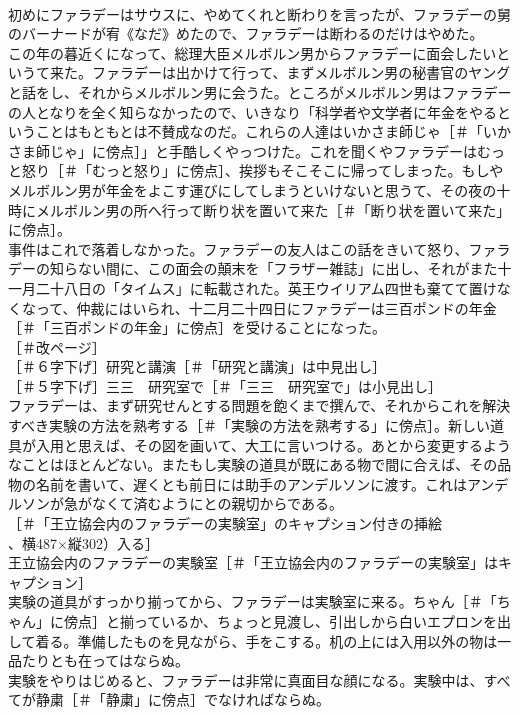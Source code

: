 \documentclass[8pt]{extreport}
\begin{document}
\begin{CJK}{UTF8}{min}
\\	初めにファラデーはサウスに、やめてくれと断わりを言ったが、ファラデーの舅のバーナードが宥《なだ》めたので、ファラデーは断わるのだけはやめた。
\\	この年の暮近くになって、総理大臣メルボルン男からファラデーに面会したいというて来た。ファラデーは出かけて行って、まずメルボルン男の秘書官のヤングと話をし、それからメルボルン男に会うた。ところがメルボルン男はファラデーの人となりを全く知らなかったので、いきなり「科学者や文学者に年金をやるということはもともとは不賛成なのだ。これらの人達はいかさま師じゃ［＃「いかさま師じゃ」に傍点］」と手酷しくやっつけた。これを聞くやファラデーはむっと怒り［＃「むっと怒り」に傍点］、挨拶もそこそこに帰ってしまった。もしやメルボルン男が年金をよこす運びにしてしまうといけないと思うて、その夜の十時にメルボルン男の所へ行って断り状を置いて来た［＃「断り状を置いて来た」に傍点］。
\\	事件はこれで落着しなかった。ファラデーの友人はこの話をきいて怒り、ファラデーの知らない間に、この面会の顛末を「フラザー雑誌」に出し、それがまた十一月二十八日の「タイムス」に転載された。英王ウイリアム四世も棄てて置けなくなって、仲裁にはいられ、十二月二十四日にファラデーは三百ポンドの年金［＃「三百ポンドの年金」に傍点］を受けることになった。
\\	［＃改ページ］
\\	［＃６字下げ］研究と講演［＃「研究と講演」は中見出し］
\\	［＃５字下げ］三三　研究室で［＃「三三　研究室で」は小見出し］
\\	ファラデーは、まず研究せんとする問題を飽くまで撰んで、それからこれを解決すべき実験の方法を熟考する［＃「実験の方法を熟考する」に傍点］。新しい道具が入用と思えば、その図を画いて、大工に言いつける。あとから変更するようなことはほとんどない。またもし実験の道具が既にある物で間に合えば、その品物の名前を書いて、遅くとも前日には助手のアンデルソンに渡す。これはアンデルソンが急がなくて済むようにとの親切からである。
\\	［＃「王立協会内のファラデーの実験室」のキャプション付きの挿絵
\\	、横487×縦302）入る］
\\	王立協会内のファラデーの実験室［＃「王立協会内のファラデーの実験室」はキャプション］ 
\\	実験の道具がすっかり揃ってから、ファラデーは実験室に来る。ちゃん［＃「ちゃん」に傍点］と揃っているか、ちょっと見渡し、引出しから白いエプロンを出して着る。準備したものを見ながら、手をこする。机の上には入用以外の物は一品たりとも在ってはならぬ。
\\	実験をやりはじめると、ファラデーは非常に真面目な顔になる。実験中は、すべてが静粛［＃「静粛」に傍点］でなければならぬ。

\end{CJK}
\end{document}
